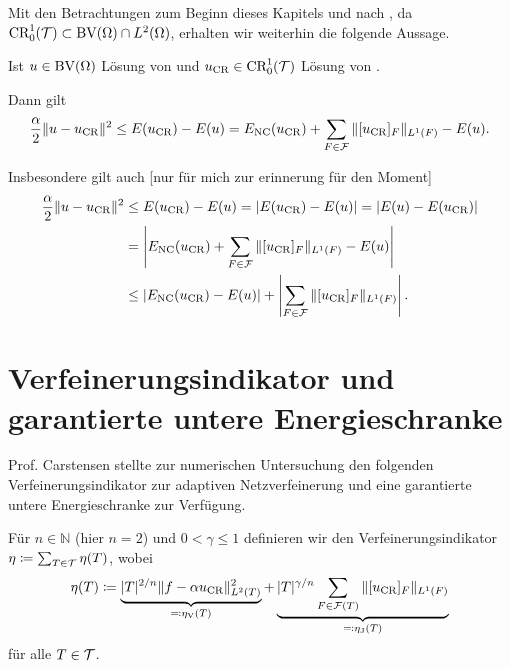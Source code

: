 Mit den Betrachtungen zum Beginn dieses Kapitels und nach 
, da $\textup{CR}^1_0(\mathcal{T})\subset\textup{BV}(\Omega)\cap L^2(\Omega)$,
erhalten wir weiterhin die folgende Aussage.

\begin{corollary}
  Ist $u\in\textup{BV}(\Omega)$ Lösung von  und
  $u_\textup{CR}\in\textup{CR}^1_0(\mathcal{T})$ Lösung von .

  Dann gilt
  \begin{align*}
    \frac{\alpha}{2}\Vert u-u_\textup{CR}\Vert^2\leq
    E(u_\textup{CR})-E(u)=E_\textup{NC}(u_\textup{CR})+\sum_{F\in\mathcal{F}}\Vert[u_\textup{CR}]_F\Vert_{L^1(F)}-E(u).
  \end{align*}

  Insbesondere gilt auch  [nur für mich zur erinnerung für den Moment]
  \begin{align*}
    \frac{\alpha}{2}\Vert u-u_\textup{CR}\Vert^2&\leq
    E(u_\textup{CR})-E(u)=
    |E(u_\textup{CR})-E(u)|=
    |E(u)-E(u_\textup{CR})|\\
    &=\left|E_\textup{NC}(u_\textup{CR})+\sum_{F\in\mathcal{F}}\Vert[u_\textup{CR}]_F\Vert_{L^1(F)}-E(u)\right|\\
    &\leq
    \left|E_\textup{NC}(u_\textup{CR})-E(u)\right|+
    \left|\sum_{F\in\mathcal{F}}\Vert[u_\textup{CR}]_F\Vert_{L^1(F)}\right|.
  \end{align*}
\end{corollary}

\section{Verfeinerungsindikator und garantierte untere Energieschranke}
Prof. Carstensen stellte zur numerischen Untersuchung den folgenden
Verfeinerungsindikator zur adaptiven Netzverfeinerung  und eine 
garantierte untere Energieschranke zur Verfügung.

\begin{definition}[Verfeinerungsindikator]\label{def:refinementIndicator}
  Für $n\in\mathbb{N}$ (hier $n=2$) und $0<\gamma\leq 1$ definieren wir den
  Verfeinerungsindikator $\eta\coloneqq\sum_{T\in\mathcal{T}}\eta(T)$, wobei
  \begin{align} \label{eq:refinementIndicator} 
    \eta (T)\coloneqq
    \underbrace{|T|^{2/n}\Vert f-\alpha u_\textup{CR}\Vert^2_{L^2(T)}}_{\eqqcolon
    \eta_\text{V}(T)} +\underbrace{|T|^{\gamma/n}\sum_{F\in\mathcal{F}(T)}\Vert
    [u_\textup{CR}]_F\Vert_{L^1(F)}}_{ \eqqcolon \eta_\text{J}(T)} 
  \end{align} 
  für alle $T\in\mathcal{T}$.
\end{definition}

